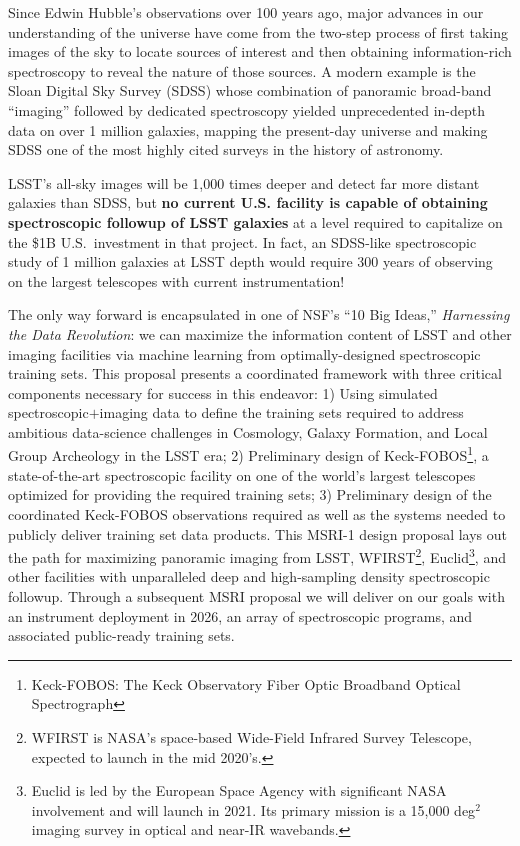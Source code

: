 \documentclass[oneside,11pt]{amsart}
\begin{document}
Since Edwin Hubble's observations over 100 years ago, major advances in our understanding of the universe have come
from the two-step process of first taking images of the sky to locate sources of interest and then obtaining
information-rich spectroscopy to reveal the nature of those sources.  A modern example is the Sloan Digital Sky Survey
(SDSS) whose combination of panoramic broad-band ``imaging'' followed by dedicated spectroscopy yielded 
unprecedented in-depth data on over 1 million galaxies, mapping the present-day universe and making SDSS one of the most
highly cited surveys in the history of astronomy.


LSST's all-sky images will be 1,000 times deeper and detect far more distant galaxies than SDSS, but \textbf{no current
U.S. facility is capable of obtaining spectroscopic followup of LSST galaxies} at a level required to capitalize on the \$1B U.S.\
investment in that project.  In fact, an SDSS-like spectroscopic study of 1 million galaxies at LSST depth would require 300 years of observing on the largest telescopes with current instrumentation!  

The only way forward is encapsulated in one of NSF's ``10 Big Ideas,''  \emph{Harnessing the Data Revolution}: we can maximize the information content of LSST and other imaging facilities via machine learning from
optimally-designed spectroscopic training sets.  This proposal presents a coordinated framework with three critical
components necessary for success in this endeavor: 1) Using simulated spectroscopic$+$imaging data to define the
training sets required to address ambitious data-science challenges in Cosmology, Galaxy Formation, and Local Group
Archeology in the LSST era; 2) Preliminary design of Keck-FOBOS\footnote{Keck-FOBOS: The Keck Observatory Fiber Optic
Broadband Optical Spectrograph}, a state-of-the-art spectroscopic facility on one of the world's largest telescopes
optimized for providing the required training sets; 3) Preliminary design of the coordinated Keck-FOBOS observations
required as well as the systems needed to publicly deliver training set data products.  This MSRI-1 design proposal
lays out the path for maximizing panoramic imaging from LSST, WFIRST\footnote{WFIRST is NASA's space-based Wide-Field
Infrared Survey Telescope, expected to launch in the mid 2020's.}, Euclid\footnote{Euclid is led by the European Space
Agency with significant NASA involvement and will launch in 2021. Its primary mission is a 15,000 deg$^2$ imaging
survey in optical and near-IR wavebands.}, and other facilities with unparalleled deep and high-sampling density
spectroscopic followup.  Through a subsequent MSRI proposal we will deliver on our goals with an instrument deployment
in 2026, an array of spectroscopic programs, and associated public-ready training sets.
\end{document}
